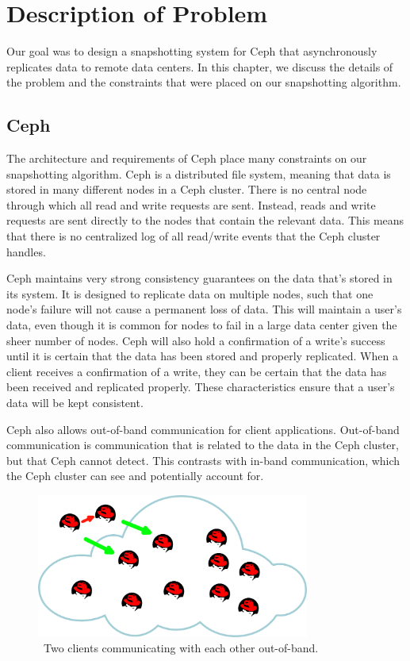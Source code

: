 \chapter{Description of Problem}
\label{sec:description}

Our goal was to design a snapshotting system for Ceph that
asynchronously replicates data to remote data centers. In this
chapter, we discuss the details of the problem and the constraints
that were placed on our snapshotting algorithm.

\section{Ceph}

The architecture and requirements of Ceph place many constraints on
our snapshotting algorithm. Ceph is a distributed file system, meaning that data is
stored in many different nodes in a Ceph cluster. There is no central
node through which all read and write requests are sent.  Instead,
reads and write requests are sent directly to the nodes that contain
the relevant data. This means that there is no centralized log of all
read/write events that the Ceph cluster handles.

Ceph maintains very strong consistency guarantees on the data that's 
stored in its system. It is designed to replicate data on multiple nodes, such 
that one node's failure will not cause a permanent loss of data. This will 
maintain a user's data, even though it is common for nodes to fail in a large 
data center given the sheer number of nodes. Ceph will also hold a
confirmation of a write's success until it is certain that the data has been 
stored and properly replicated. When a client receives a confirmation of a write, they can be certain that the data has been received and replicated properly. These characteristics ensure that a user's 
data will be kept consistent.

Ceph also allows out-of-band communication for client applications. 
Out-of-band communication is communication that is related to the data in the 
Ceph cluster, but that Ceph cannot detect. This contrasts with in-band
communication, which the Ceph cluster can see and potentially account for. 

\begin{figure}[!htbp]
  \centering
  \caption{~Two clients communicating with each other out-of-band.} 
  \label{fig:out-of-band}
  \includegraphics[width=0.8\textwidth]{outofbandwrite.png}
\end{figure}

